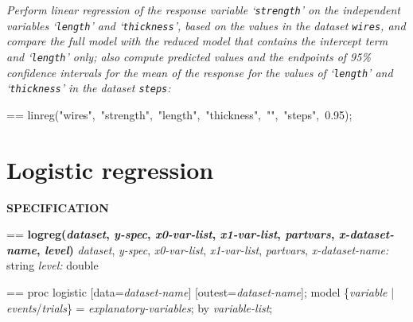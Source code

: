 \documentclass{book}
\makeatletter
\newcommand\Texinfocommandstyletextvar[1]{{\normalfont{}\textsl{#1}}}%
\newenvironment{Texinfopreformatted}{%
  \par\GNUTobeylines\obeyspaces\frenchspacing\parskip=\z@\parindent=\z@}{}
{\catcode`\^^M=13 \gdef\GNUTobeylines{\catcode`\^^M=13 \def^^M{\null\par}}}
\newenvironment{Texinfoindented}{\begin{list}{}{}\item\relax}{\end{list}}
\renewcommand{\_}{\Texinfounderscore\discretionary{}{}{}}
\makeatother
\begin{document}
\emph{Perform linear regression of the response variable `\texttt{strength}'
on the independent variables `\texttt{length}' and `\texttt{thickness}', based
on the values in the dataset \texttt{wires}, and
compare the full model with the reduced model that contains the
intercept term and `\texttt{length}' only; also compute predicted values and
the endpoints of 95\% confidence intervals for the mean of the response
for the values of `\texttt{length}'
and `\texttt{thickness}' in the dataset \texttt{steps}:}
\begin{Texinfoindented}
\begin{Texinfopreformatted}%
\ttfamily linreg("wires",\ "strength",\ "length",\ "thickness",\ "",\ "steps",\ 0.95);
\end{Texinfopreformatted}
\end{Texinfoindented}
%
%

\section{{Logistic regression}}
\label{anchor:Logistic-regression}%

\noindent{}\textbf{SPECIFICATION}
\begin{Texinfoindented}
\begin{Texinfopreformatted}%
\textbf{logreg(\Texinfocommandstyletextvar{dataset}, \Texinfocommandstyletextvar{y-spec}, \Texinfocommandstyletextvar{x0-var-list}, \Texinfocommandstyletextvar{x1-var-list}, \Texinfocommandstyletextvar{partvars}, \Texinfocommandstyletextvar{x-dataset-name}, \Texinfocommandstyletextvar{level})}
\Texinfocommandstyletextvar{dataset}, \Texinfocommandstyletextvar{y-spec}, \Texinfocommandstyletextvar{x0-var-list}, \Texinfocommandstyletextvar{x1-var-list}, \Texinfocommandstyletextvar{partvars}, \Texinfocommandstyletextvar{x-dataset-name:} string
\Texinfocommandstyletextvar{level:} double
\end{Texinfopreformatted}
\end{Texinfoindented}

\begin{Texinfoindented}
\begin{Texinfopreformatted}%
proc logistic [data=\Texinfocommandstyletextvar{dataset-name}] [outest=\Texinfocommandstyletextvar{dataset-name}];
model \{\Texinfocommandstyletextvar{variable} | \Texinfocommandstyletextvar{events}/\Texinfocommandstyletextvar{trials}\} = \Texinfocommandstyletextvar{explanatory-variables};
by \Texinfocommandstyletextvar{variable-list};

\end{Texinfopreformatted}
\end{Texinfoindented}
\end{document}
